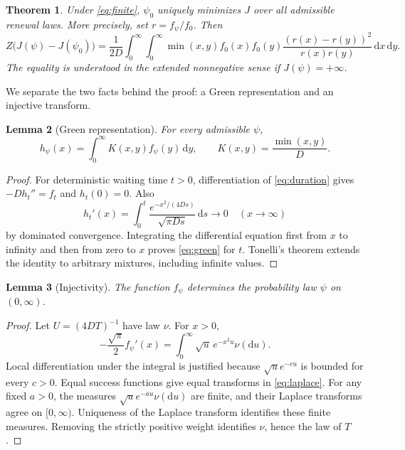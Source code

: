\documentclass[11pt]{amsart}
\newtheorem{theorem}{Theorem}[section]
\newtheorem{lemma}[theorem]{Lemma}
\theoremstyle{definition}
\theoremstyle{remark}
\newcommand{\dd}{\,\mathrm d}
\begin{document}
\begin{theorem}\label{thm:brownian}
Under \eqref{eq:finite}, $\psi_0$ uniquely minimizes $J$ over all admissible renewal laws. More precisely, set $r=f_\psi/f_0$. Then
\begin{equation}\label{eq:gap}
 Z\bigl(J(\psi)-J(\psi_0)\bigr)
 =\frac1{2D}\int_0^\infty\!\int_0^\infty
 \min(x,y)f_0(x)f_0(y)
 \frac{(r(x)-r(y))^2}{r(x)r(y)}\dd x\dd y.
\end{equation}
The equality is understood in the extended nonnegative sense if $J(\psi)=+\infty$.
\end{theorem}

We separate the two facts behind the proof: a Green representation and an injective transform.

\begin{lemma}[Green representation]\label{lem:green}
For every admissible $\psi$,
\begin{equation}\label{eq:green}
 h_\psi(x)=\int_0^\infty K(x,y)f_\psi(y)\dd y,
 \qquad K(x,y)=\frac{\min(x,y)}D.
\end{equation}
\end{lemma}
\begin{proof}
For deterministic waiting time $t>0$, differentiation of \eqref{eq:duration} gives
$-D h_t''=f_t$ and $h_t(0)=0$. Also
\[
 h_t'(x)=\int_0^t\frac{e^{-x^2/(4Ds)}}{\sqrt{\pi Ds}}\dd s\longrightarrow0
 \quad(x\longrightarrow\infty)
\]
by dominated convergence. Integrating the differential equation first from $x$ to infinity and then from zero to $x$ proves \eqref{eq:green} for $t$. Tonelli's theorem extends the identity to arbitrary mixtures, including infinite values.
\end{proof}

\begin{lemma}[Injectivity]\label{lem:injective}
The function $f_\psi$ determines the probability law $\psi$ on $(0,\infty)$.
\end{lemma}
\begin{proof}
Let $U=(4DT)^{-1}$ have law $\nu$. For $x>0$,
\begin{equation}\label{eq:laplace}
 -\frac{\sqrt\pi}{2}f_\psi'(x)
 =\int_0^\infty \sqrt u\,e^{-x^2u}\nu(\mathrm du).
\end{equation}
Local differentiation under the integral is justified because $\sqrt u e^{-cu}$ is bounded for every $c>0$. Equal success functions give equal transforms in \eqref{eq:laplace}. For any fixed $a>0$, the measures $\sqrt u e^{-au}\nu(\mathrm du)$ are finite, and their Laplace transforms agree on $[0,\infty)$. Uniqueness of the Laplace transform identifies these finite measures. Removing the strictly positive weight identifies $\nu$, hence the law of $T$.
\end{proof}
\end{document}
